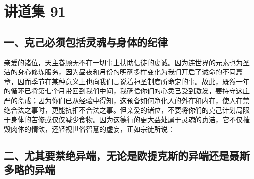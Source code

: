 

\section{讲道集 91}

\par


\subsection{一、克己必须包括灵魂与身体的纪律}

亲爱的诸位，天主眷顾无不在一切事上扶助信徒的虔诚。因为连世界的元素也为圣洁的身心修炼服务，因为昼夜和月份的明确多样变化为我们开启了诫命的不同篇章，因而季节在某种意义上也向我们言说着神圣制度所命定的事。故此，既然一年的循环已将第七个月带回到我们中间，我确信你们的心灵已受到激发，要持守这庄严的斋戒；因为你们已从经验中得知，这预备如何净化人的外在和内在，使人在禁绝合法之事时，更能抗拒不合法之事。但亲爱的诸位，不要将你们的克己计划局限于身体的苦修或仅仅减少食物。因为这德行的更大益处属于灵魂的贞洁，它不仅摧毁肉体的情欲，还轻视世俗智慧的虚妄，正如宗徒所说：\par


\subsection{二、尤其要禁绝异端，无论是欧提克斯的异端还是聂斯多略的异端}

